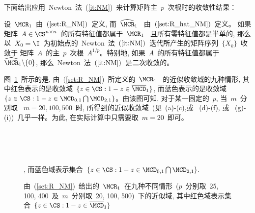 下面给出应用~Newton~法~(\ref{it:NM})~来计算矩阵主~$p$~次根时的收敛性结果：


\begin{theorem}
\label{th:MatrixNMCon} 设~$\MCR_1$~由~$(\ref{set:R_NM})$~定义,
而~$\widehat{\MCR}_1$~ 由~$(\ref{set:R_hat_NM})$~定义。 如果矩阵~$A
\in \CS^{n \times n}$~的所有特征值都属于~$\MCR_1$~
且所有零特征值都是半单的, 那么以~$X_0 =
\I$~为初始点的~Newton~法~$(\ref{it:NM})$~迭代所产生的矩阵序列~$\{X_k\}$~收敛于
矩阵~$A$~的主~$p$~次根~$A^{1/p}$。特别地,
如果~$A$~的所有特征值都属于~$\widehat{\MCR}_1\backslash\{0\}$,
那么~Newton~法~$(\ref{it:NM})$~是二次收敛的。
\end{theorem}

\begin{remark}
图~\ref{fig:NM_ConvReg}~所示的是,
由~(\ref{set:R_NM})~所定义的~$\MCR_1$~ 的近似收敛域的九种情形,
其中红色表示的是收敛域~$\{z \in \CS: 1-z \in \overline{\MCD}_1\}$,
而蓝色表示的是收敛域~$\{z\in \CS: 1-z \in
\MCD_{0,1}\bigcap\MCD_{2,1}\}$。由该图可知, 对于某一固定的~$p$,
当~$m$~分别取 ~$m=20, 100, 500$~时,
所得到的近似收敛域~(见~(a)-(c),或 ~(d)-(f), 或
~(g)-(i))~几乎一样。为此, 在实际计算中只需要取~$m=20$~即可。
\end{remark}

\begin{figure}[h!]
\centering
{}
\\
\\
\\
\caption{由~(\ref{set:R_NM})~给出的~$\MCR_1$~在九种不同情形~($p$~分别取~25,
100, 400~及~$m$~分别取~20, 100, 500)~下的近似域,
其中红色域表示集合~$\{z\in\CS: 1-z \in \overline{\MCD}_1\}$},
而蓝色域表示集合~$\{z\in \CS: 1-z \in \MCD_{0,1}
\bigcap\MCD_{2,1}\}.$\label{fig:NM_ConvReg}
\end{figure}
















